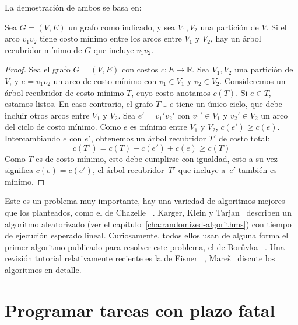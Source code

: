   La demostración de ambos se basa en:
  \begin{proposition}
    \label{prop:base-MST}
    Sea \(G = (V, E)\) un grafo como indicado,
    y sea \(V_1, V_2\) una partición de \(V\).
    Si el arco \(v_1 v_2\) tiene costo mínimo entre los arcos
    entre \(V_1\) y \(V_2\),
    hay un árbol recubridor mínimo de \(G\) que incluye \(v_1 v_2\).
  \end{proposition}
  \begin{proof}
    Sea el grafo \(G = (V, E)\) con costos \(c \colon E \to \mathbb{R}\).
    Sea \(V_1, V_2\) una partición de \(V\),
    y \(e = v_1 v_2\) un arco de costo mínimo
    con \(v_1 \in V_1\) y \(v_2 \in V_2\).
    Consideremos un árbol recubridor de costo mínimo \(T\),
    cuyo costo anotamos \(c(T)\).
    Si \(e \in T\),
    estamos listos.
    En caso contrario,
    el grafo \(T \cup e\) tiene un único ciclo,
    que debe incluir otros arcos entre \(V_1\) y \(V_2\).
    Sea \(e' = v_1' v_2'\) con \(v_1' \in V_1\) y \(v_2' \in V_2\)
    un arco del ciclo de costo mínimo.
    Como \(e\) es mínimo entre \(V_1\) y \(V_2\),
    \(c(e') \ge c(e)\).
    Intercambiando \(e\) con \(e'\),
    obtenemos un árbol recubridor \(T'\)
    de costo total:
    \begin{equation*}
      c(T') = c(T) - c(e') + c(e) \ge c(T)
    \end{equation*}
    Como \(T\) es de costo mínimo,
    esto debe cumplirse con igualdad,
    esto a su vez significa \(c(e) = c(e')\),
    el árbol recubridor~\(T'\) que incluye a~\(e'\) también es mínimo.
  \end{proof}

  Este es un problema muy importante,
  hay una variedad de algoritmos mejores que los planteados,
  como el de Chazelle~%
   \cite{chazelle00:_soft_heap,chazelle00:_minimal_spanning_tree}.
  Karger, Klein y Tarjan~%
    \cite{karger95:_random_linear_time_MST}
  describen un algoritmo aleatorizado
  (ver el capítulo~\ref{cha:randomized-algorithms})
  con tiempo de ejecución esperado lineal.
  Curiosamente,
  todos ellos usan de alguna forma
  el primer algoritmo publicado para resolver este problema,
  el de Borůvka~%
    \cite{boruvka26:_problemu_minimalnim}.
  Una revisión tutorial relativamente reciente es la de Eisner~%
    \cite{eisner97:_state_art_algor_minim_spann_trees},
  Mareš~%
    \cite{mares08:_graph_algorithms}
  discute los algoritmos en detalle.

\section{Programar tareas con plazo fatal}
\label{sec:tareas-plazo-fatal}

